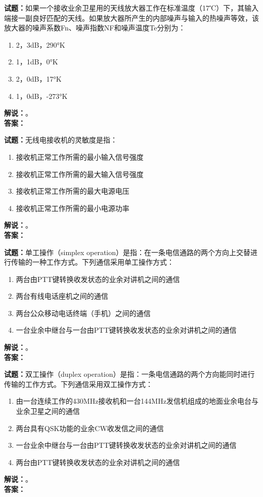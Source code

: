 \documentclass{ctexbook}
\begin{document}
\bigskip




\noindent\textbf{试题：}如果一个接收业余卫星用的天线放大器工作在标准温度（17℃）下，其输入端接一副良好匹配的天线。如果放大器所产生的内部噪声与输入的热噪声等效，该放大器的噪声系数Fn、噪声指数NF和噪声温度Te分别为：
\begin{enumerate}[leftmargin=3em]
\item 2，3dB，290°K
\item 1，1dB，0°K
\item 2，0dB，17°K
\item 1，0dB，-273°K
\end{enumerate}
\noindent\textbf{解说：}\textbf{}。\\\noindent\textbf{答案：}

\bigskip




\noindent\textbf{试题：}无线电接收机的灵敏度是指：
\begin{enumerate}[leftmargin=3em]
\item 接收机正常工作所需的最小输入信号强度
\item 接收机正常工作所需的最大输入信号强度
\item 接收机正常工作所需的最大电源电压
\item 接收机正常工作所需的最小电源功率
\end{enumerate}
\noindent\textbf{解说：}\textbf{}。\\\noindent\textbf{答案：}

\bigskip




\noindent\textbf{试题：}单工操作（simplex operation）是指：在一条电信通路的两个方向上交替进行传输的一种工作方式。下列通信采用单工操作方式：
\begin{enumerate}[leftmargin=3em]
\item 两台由PTT键转换收发状态的业余对讲机之间的通信
\item 两台有线电话座机之间的通信
\item 两台公众移动电话终端（手机）之间的通信
\item 一台业余中继台与一台由PTT键转换收发状态的业余对讲机之间的通信
\end{enumerate}
\noindent\textbf{解说：}\textbf{}。\\\noindent\textbf{答案：}

\bigskip




\noindent\textbf{试题：}双工操作（duplex operation）是指：一条电信通路的两个方向能同时进行传输的工作方式。下列通信采用双工操作方式：
\begin{enumerate}[leftmargin=3em]
\item 由一台连续工作的430\unit{\MHz}接收机和一台144\unit{\MHz}发信机组成的地面业余电台与业余卫星之间的通信
\item 两台具有QSK功能的业余CW收发信之间的通信
\item 一台业余中继台与一台由PTT键转换收发状态的业余对讲机之间的通信
\item 两台由PTT键转换收发状态的业余对讲机之间的通信
\end{enumerate}
\noindent\textbf{解说：}\textbf{}。\\\noindent\textbf{答案：}
\end{document}
